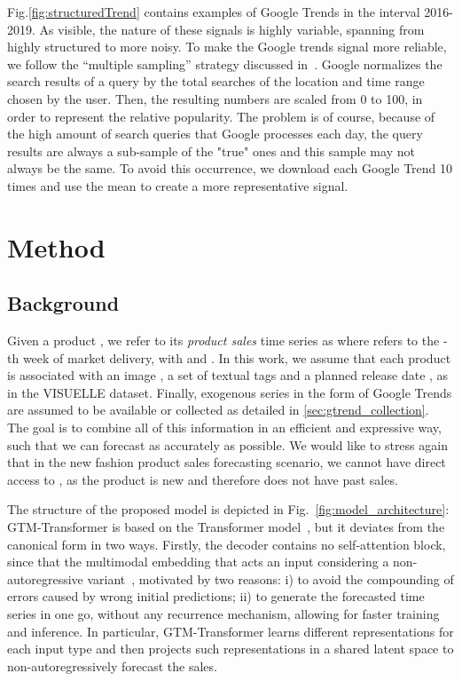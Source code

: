 \documentclass{article}
\newcommand{\datasetname}[0] {VISUELLE}
\newcommand{\approachname}[0] {GTM-Transformer\xspace}
\begin{document}
Fig.\ref{fig:structuredTrend} contains examples of Google Trends in the interval 2016-2019. As visible, the nature of these signals is highly variable, spanning from highly structured to more noisy. To make the Google trends signal more reliable, we follow the ``multiple sampling'' strategy discussed in~\cite{medeiros2021proper}. Google normalizes the search results of a query by the total searches of the location and time range chosen by the user. Then, the resulting numbers are scaled from 0 to 100, in order to represent the relative popularity. The problem is of course, because of the high amount of search queries that Google processes each day, the query results are always a sub-sample of the "true" ones and this sample may not always be the same. To avoid this occurrence, we download each Google Trend 10 times and use the mean to create a more representative signal.
 
\section{Method}\label{sec:method}
\subsection{Background}\label{sec:attention}
Given a product , we refer to its \emph{product sales} time series as  where  refers to the -th week of market delivery, with  and . In this work, we assume that each product  is associated with an image , a set of textual tags  and a planned release date , as in the \datasetname{} dataset. Finally, exogenous series in the form of Google Trends are assumed to be available or collected as detailed in \ref{sec:gtrend_collection}. The goal is to combine all of this information in an efficient and expressive way, such that we can forecast  as accurately as possible. We would like to stress again that in the new fashion product sales forecasting scenario, we cannot have direct access to , as the product  is new and therefore does not have past sales.

The structure of the proposed model is depicted in Fig.~\ref{fig:model_architecture}: \approachname{} is based on the Transformer model~\cite{vaswani2017attention}, but it deviates from the canonical form in two ways. Firstly, the decoder contains no self-attention block, since that the multimodal embedding that acts an input considering a non-autoregressive variant~\cite{gu2017non}, motivated by two reasons: i) to avoid the compounding of errors caused by wrong initial predictions; ii) to generate the forecasted time series in one go, without any recurrence mechanism, allowing for faster training and inference. In particular, \approachname{} learns different representations for each input type and then projects such representations in a shared latent space to non-autoregressively forecast the sales. 
\end{document}
